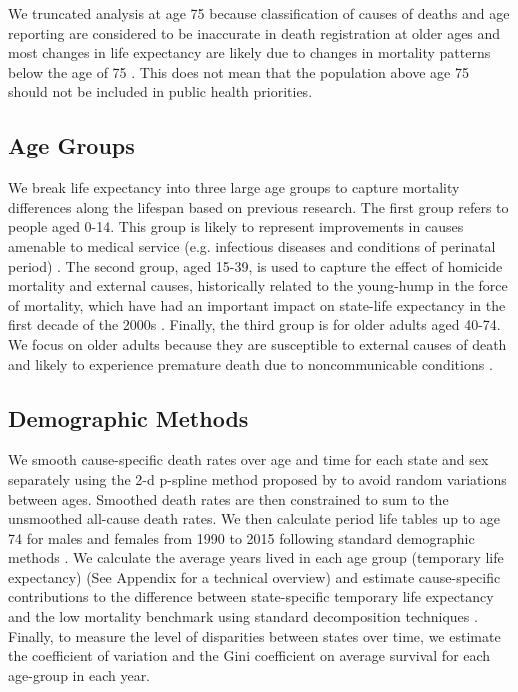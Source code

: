 \documentclass[11.5pt]{article}
\begin{document}
\begin{spacing}{1.5}
We truncated analysis at age 75 because classification of causes of deaths and age reporting are considered to be inaccurate in death registration at older ages \citep{tobias2001} and most changes in life expectancy are likely due to changes in mortality patterns below the age of 75 \citep{Aburto2015}. This does not mean that the population above age 75 should not be included in public health priorities.

\subsection*{Age Groups}

We break life expectancy into three large age groups to capture mortality differences along the lifespan based on previous research. The first group refers to people aged 0-14. This group is likely to represent improvements in causes amenable to medical service (e.g. infectious diseases and conditions of perinatal period) \citep{canudas2014}. The second group, aged 15-39, is used to capture the effect of homicide mortality and external causes, historically related to the young-hump in the force of mortality, which have had an important impact on state-life expectancy in the first decade of the 2000s \citep{Aburto2015}. Finally, the third group is for older adults aged 40-74. 
We focus on older adults because they are susceptible to external causes of death and likely to experience premature death due to noncommunicable conditions \citep{gomez2016dissonant}.

\subsection*{Demographic Methods}
We smooth cause-specific death rates over age and time for each
state and sex separately using the 2-d p-spline method proposed by
\citet{GC2012} to avoid random variations between ages. Smoothed death rates are
then constrained to sum to the unsmoothed all-cause death rates. We then calculate period life tables up to
age 74 for males and females from 1990 to 2015 following standard demographic methods \citep{preston2001}. We calculate the average years lived in each age group (temporary life expectancy) \citep{arriaga1984} (See Appendix for a technical overview) and estimate cause-specific contributions to the difference between
state-specific temporary life expectancy and  the low mortality benchmark using
 standard decomposition techniques \citep{horiuchi2008}. Finally, to measure the level of disparities between states over time, we estimate the coefficient of variation and the Gini coefficient on average survival for each age-group in each year. 


\end{spacing}
\end{document}
